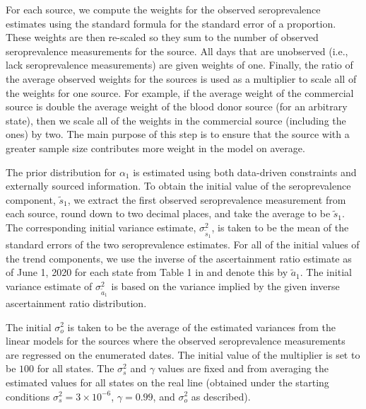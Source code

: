 For each source, we compute the weights for the observed seroprevalence
estimates using the standard formula for the standard error of a proportion.
These weights are then re-scaled so they sum to the number of observed
seroprevalence measurements for the source. All days that are unobserved (i.e.,
lack seroprevalence measurements) are given weights of one. Finally, the ratio
of the average observed weights for the sources is used as a multiplier to scale
all of the weights for one source. For example, if the average weight of the
commercial source is double the average weight of the blood donor source (for an
arbitrary state), then we scale all of the weights in the commercial source
(including the ones) by two. The main purpose of this step is to ensure that
the source with a greater sample size contributes more weight in the model on
average. %

The prior distribution for $\alpha_1$ is estimated using both data-driven
constraints and externally sourced information. To obtain the initial value of
the seroprevalence component, $\tilde{s}_{1}$, we extract the first observed
seroprevalence measurement from each source, round down to two decimal places,
and take the average to be $\tilde{s}_{1}$. The corresponding initial variance
estimate, $\sigma^2_{\tilde{s}_{1}}$, is taken to be the mean of the standard
errors of the two seroprevalence estimates. For all of the initial values of the
trend components, we use the inverse of the ascertainment ratio estimate as of
June 1, 2020 for each state from Table 1 in \citep{unwin2020state} and denote
this by $\tilde{a}_1$. The initial variance estimate of $\sigma^2_{\tilde{a}_1}$
is based on the variance implied by the given inverse ascertainment ratio
distribution.

The initial $\sigma^2_o$ is taken to be the average of the estimated variances
from the linear models for the sources where the observed seroprevalence
measurements are regressed on the enumerated dates. The initial value of 
the multiplier is set to be $100$ for all states. The $\sigma^2_s$ and $\gamma$ 
values are fixed and from averaging the estimated values for all states on the real line
(obtained under the starting conditions $\sigma^2_s = 3\times
10^{-6}$,%
$\gamma = 0.99$,
and $\sigma^2_o$ as described).

